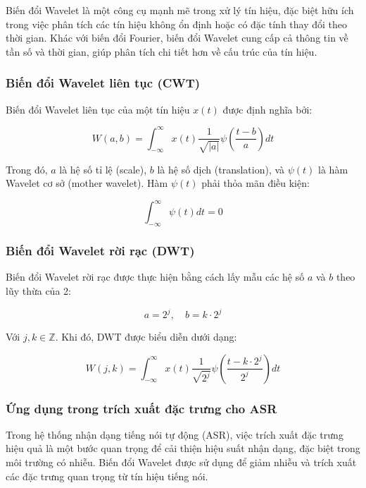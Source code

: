 \documentclass{article}
\begin{document}
Biến đổi Wavelet là một công cụ mạnh mẽ trong xử lý tín hiệu, đặc biệt hữu ích trong việc phân tích các tín hiệu không ổn định hoặc có đặc tính thay đổi theo thời gian. Khác với biến đổi Fourier, biến đổi Wavelet cung cấp cả thông tin về tần số và thời gian, giúp phân tích chi tiết hơn về cấu trúc của tín hiệu.

\subsubsection{Biến đổi Wavelet liên tục (CWT)}

Biến đổi Wavelet liên tục của một tín hiệu $x(t)$ được định nghĩa bởi:

\begin{equation}
    W(a, b) = \int_{-\infty}^{\infty} x(t) \frac{1}{\sqrt{|a|}} \psi\left(\frac{t - b}{a}\right) dt
\end{equation}

Trong đó, $a$ là hệ số tỉ lệ (scale), $b$ là hệ số dịch (translation), và $\psi(t)$ là hàm Wavelet cơ sở (mother wavelet). Hàm $\psi(t)$ phải thỏa mãn điều kiện:

\begin{equation}
    \int_{-\infty}^{\infty} \psi(t) dt = 0
\end{equation}

\subsubsection{Biến đổi Wavelet rời rạc (DWT)}

Biến đổi Wavelet rời rạc được thực hiện bằng cách lấy mẫu các hệ số $a$ và $b$ theo lũy thừa của 2:

\begin{equation}
    a = 2^j, \quad b = k \cdot 2^j
\end{equation}

Với $j, k \in \mathbb{Z}$. Khi đó, DWT được biểu diễn dưới dạng:

\begin{equation}
    W(j, k) = \int_{-\infty}^{\infty} x(t) \frac{1}{\sqrt{2^j}} \psi\left(\frac{t - k \cdot 2^j}{2^j}\right) dt
\end{equation}

\subsubsection{Ứng dụng trong trích xuất đặc trưng cho ASR}

Trong hệ thống nhận dạng tiếng nói tự động (ASR), việc trích xuất đặc trưng hiệu quả là một bước quan trọng để cải thiện hiệu suất nhận dạng, đặc biệt trong môi trường có nhiễu. Biến đổi Wavelet được sử dụng để giảm nhiễu và trích xuất các đặc trưng quan trọng từ tín hiệu tiếng nói.
\end{document}
